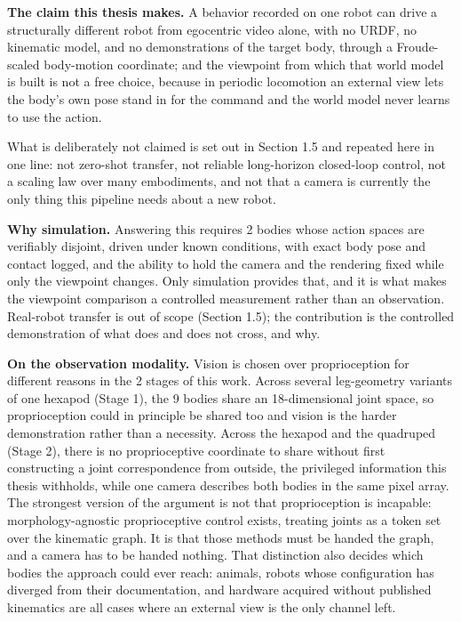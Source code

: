 \documentclass[12pt,a4paper,oneside]{report}
\begin{document}
\noindent\textbf{The claim this thesis makes.} A behavior recorded on one robot can drive a
structurally different robot from egocentric video alone, with no URDF, no kinematic model, and no
demonstrations of the target body, through a Froude-scaled body-motion coordinate; and the viewpoint
from which that world model is built is not a free choice, because in periodic locomotion an external
view lets the body's own pose stand in for the command and the world model never learns to use the
action.

\noindent What is deliberately not claimed is set out in Section 1.5 and repeated here in one
line: not zero-shot transfer, not reliable long-horizon closed-loop control, not a scaling law over
many embodiments, and not that a camera is currently the only thing this pipeline needs about a new
robot.

\noindent\textbf{Why simulation.} Answering this requires 2 bodies whose action spaces are verifiably disjoint, driven under known conditions, with
exact body pose and contact logged, and the ability to hold the camera and the rendering fixed while
only the viewpoint changes. Only simulation provides that, and it is what makes the viewpoint
comparison a controlled measurement rather than an observation. Real-robot transfer is
out of scope (Section 1.5); the contribution is the controlled demonstration of what does and does not
cross, and why.

\newpage
\noindent\textbf{On the observation modality.} Vision is chosen over
proprioception for different reasons in the 2 stages of this work. Across several leg-geometry
variants of one hexapod (Stage 1), the 9 bodies share an 18-dimensional joint space, so
proprioception could in principle be shared too and vision is the harder demonstration rather than a
necessity. Across the hexapod and the quadruped (Stage 2), there is no proprioceptive coordinate to
share without first constructing a joint correspondence from outside, the privileged
information this thesis withholds, while one camera describes both bodies in the same pixel array.
The strongest version of the argument is not that proprioception is incapable: morphology-agnostic
proprioceptive control exists, treating joints as a token set over the kinematic graph. It is that
those methods must be handed the graph, and a camera has to be handed nothing. That distinction also
decides which bodies the approach could ever reach: animals, robots whose configuration has diverged
from their documentation, and hardware acquired without published kinematics are all cases where an
external view is the only channel left.
\end{document}
